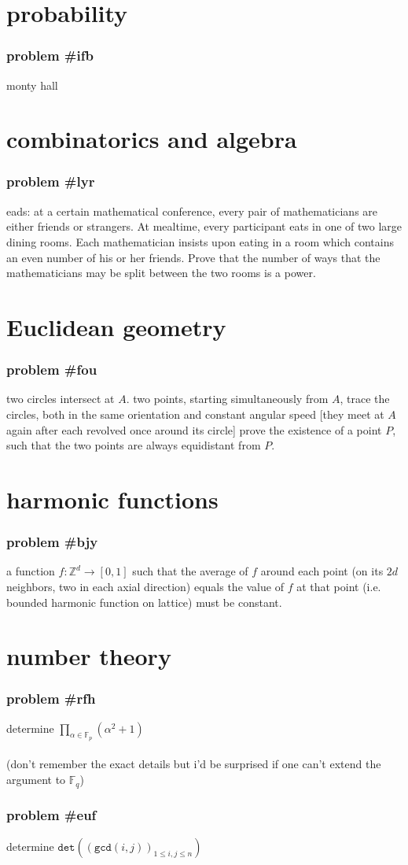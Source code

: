 \documentclass{article}
\newcommand{\problem}[1]{\subsubsection*{\textbf{problem \##1}}}
\newcommand{\chapter}[1]{\section*{#1}}
\newcommand{\Z}{\mathbb{Z}}
\newcommand{\F}{\mathbb{F}}
\newcommand{\FNC}[1]{\texttt{#1}}
\begin{document}
\chapter{probability}
\problem{ifb} monty hall
\chapter{combinatorics and algebra}
\problem{lyr} eads: at a certain mathematical conference, every pair of mathematicians are either friends or strangers.
At mealtime, every participant eats in one of two large dining rooms. Each mathematician insists upon eating in a room which contains an even number of his or her friends. Prove that the number of ways that the mathematicians may be split between the two rooms is a power.
\chapter{Euclidean geometry}
\problem{fou} two circles intersect at $A$. two points, starting simultaneously from $A$, trace the circles, both in the same orientation and constant angular speed [they meet at $A$ again after each revolved once around its
circle] prove the existence of a point $P$, such that the two points are always equidistant from $P$.
\chapter{harmonic functions}
\problem{bjy} a function $f:\Z^d\to[0,1]$ such that the average of $f$ around each point (on its $2d$ neighbors, two in each axial direction) equals the value of $f$ at that point (i.e. bounded harmonic function on lattice) must be constant.
\chapter{number theory}
\problem{rfh} determine $\displaystyle{\prod_{\alpha\in\F_p}(\alpha^2+1)}$\\\\
(don't remember the exact details but i'd be surprised if one can't extend the argument to $\F_q$)
\problem{euf} determine $\FNC{det}((\FNC{gcd}(i,j))_{1\le i,j\le n})$
\end{document}
